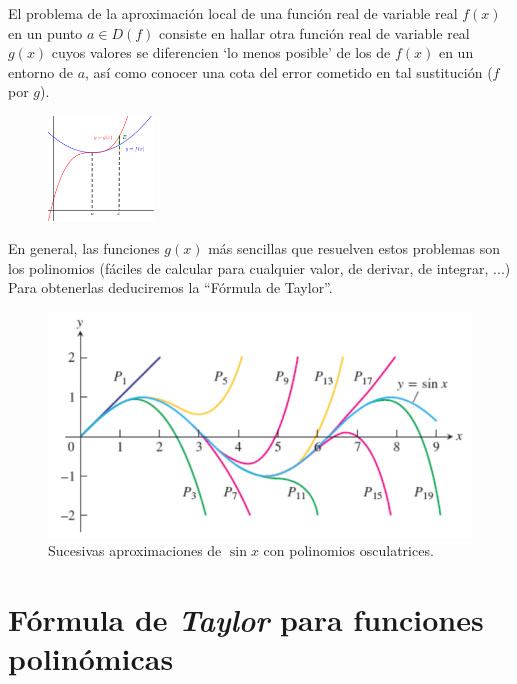 	\begin{multicols}{2}
	El problema de la aproximación local de una función real de variable real $f(x)$ en un punto $a 	\in  D(f)$ consiste en hallar otra función real de variable real $g(x)$ cuyos valores se diferencien `lo menos posible' de los de $f(x)$ en un entorno de $a$, así como conocer una cota del error cometido en tal sustitución ($f$ por $g$).
	
	\begin{figure}[H]
		\centering
		\includegraphics[width=0.25\textwidth]{imagenes/Taylor/T06IM02.png}
	\end{figure}
	
	\end{multicols}
	
	En general, las funciones $g(x)$ más sencillas que resuelven estos problemas son los polinomios \textcolor{gris}{(fáciles de calcular para cualquier valor, de derivar, de integrar, ...)} Para obtenerlas deduciremos la ``Fórmula de Taylor''.
	
	
	\begin{figure}[H]
		\centering
		\includegraphics[width=.5\textwidth]{imagenes/Taylor/T06IM06.png}
		\caption*{Sucesivas aproximaciones de $\sin x$ con polinomios osculatrices.}
	\end{figure}

	
	\section{Fórmula de \emph{Taylor} para funciones polinómicas}
	
\vspace{0.5cm}
	
